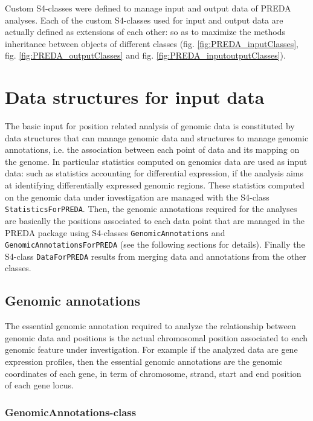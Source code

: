 \documentclass[a4paper,10pt]{article}
\begin{document}
Custom S4-classes were defined to manage input and output data of PREDA analyses. Each of the custom S4-classes used for input and output data are actually defined as extensions of each other: so as to maximize the methods inheritance between objects of different classes (fig. \ref{fig:PREDA_inputClasses}, fig. \ref{fig:PREDA_outputClasses} and fig. \ref{fig:PREDA_inputoutputClasses}).



\section{Data structures for input data}

The basic input for position related analysis of genomic data is constituted by data structures that can manage genomic data and structures to manage genomic annotations, i.e. the association between each point of data and its mapping on the genome.
In particular statistics computed on genomics data are used as input data: such as statistics accounting for differential expression, if the analysis aims at identifying differentially expressed genomic regions. These statistics computed on the genomic data under investigation are managed with the S4-class \texttt{StatisticsForPREDA}. Then, the genomic annotations required for the analyses are basically the positions associated to each data point that are managed in the PREDA package using S4-classes \texttt{GenomicAnnotations} and \texttt{GenomicAnnotationsForPREDA} (see the following sections for details).
Finally the S4-class \texttt{DataForPREDA} results from merging data and annotations from the other classes.

\subsection{Genomic annotations}

The essential genomic annotation required to analyze the relationship between genomic data and positions is the actual chromosomal position associated to each genomic feature under investigation. For example if the analyzed data are gene expression profiles, then the essential genomic annotations are the genomic coordinates of each gene, in term of chromosome, strand, start and end position of each gene locus.

\subsubsection{GenomicAnnotations-class}
\end{document}
